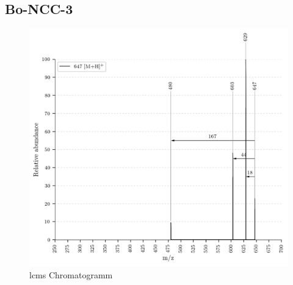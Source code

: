 \subsection{Bo-NCC-3}

\begin{figure}[!htbp]
  \centering
  \includegraphics[width=\textwidth, height=0.7\textwidth]{figures/Kapitel7/Kataboliten/VWA_MS_647.png}
  \caption[LC-MS Chromatogramm vor der Reaktion, Quelle: Author]{\gls{lcms} Chromatogramm}
  \label{fig:LCMSChromatogramm}
\end{figure}

